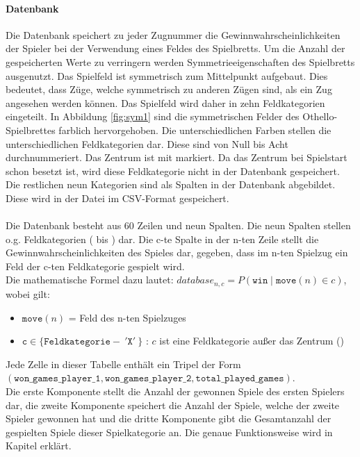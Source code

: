 \paragraph{Datenbank}
\label{para:db}
Die Datenbank speichert zu jeder Zugnummer die Gewinnwahrscheinlichkeiten der Spieler bei der Verwendung eines Feldes des Spielbretts. Um die Anzahl der gespeicherten Werte zu verringern werden Symmetrieeigenschaften des Spielbretts ausgenutzt. 
Das Spielfeld ist symmetrisch zum Mittelpunkt aufgebaut. Dies bedeutet, dass Züge, welche symmetrisch zu anderen Zügen sind, als ein Zug angesehen werden können. Das Spielfeld wird daher in zehn Feldkategorien eingeteilt. In Abbildung \ref{fig:sym1} sind die symmetrischen Felder des Othello-Spielbrettes farblich hervorgehoben. Die unterschiedlichen Farben stellen die unterschiedlichen Feldkategorien dar. Diese sind von Null bis Acht durchnummeriert. Das Zentrum ist mit  markiert. Da das Zentrum bei Spielstart schon besetzt ist, wird diese Feldkategorie nicht in der Datenbank gespeichert. Die restlichen neun Kategorien sind als Spalten in der Datenbank abgebildet. Diese wird in der Datei  im CSV-Format gespeichert.
\\
\\Die Datenbank besteht aus 60 Zeilen und neun Spalten. Die neun Spalten stellen o.g. Feldkategorien ( bis ) dar. Die c-te Spalte in der n-ten Zeile stellt die Gewinnwahrscheinlichkeiten des Spieles dar, gegeben, dass im n-ten Spielzug ein Feld der c-ten Feldkategorie gespielt wird. 
\\Die mathematische Formel dazu lautet:
$database_{n,c} = P( \mathtt{win} \mid \mathtt{move}(n) \in c)$, wobei gilt:
\begin{itemize}
\item $\mathtt{move}(n)$ = Feld des n-ten Spielzuges
\item $\mathtt{c} \in \{\mathtt{Feldkategorie} -\ '\mathtt{X}'\ \}$ : $c$ ist eine Feldkategorie außer das Zentrum ()
\end{itemize}
Jede Zelle in dieser Tabelle enthält ein Tripel der Form \\$( \mathtt{won\_games\_player\_1}, \mathtt{won\_games\_player\_2}, \mathtt{total\_played\_games})$. 
\\Die erste Komponente stellt die Anzahl der gewonnen Spiele des ersten Spielers dar, die zweite Komponente speichert die Anzahl der Spiele, welche der zweite Spieler gewonnen hat und die dritte Komponente gibt die Gesamtanzahl der gespielten Spiele dieser Spielkategorie an. Die genaue Funktionsweise wird in Kapitel  erklärt.
